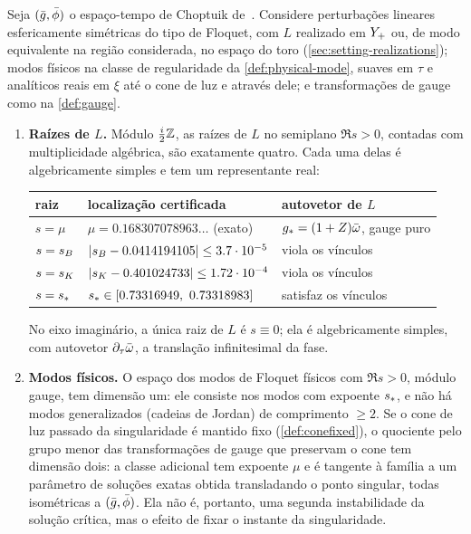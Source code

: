 \begin{mainthm}
Seja $(\bar g,\bar\phi)$ o espaço-tempo de Choptuik de~\cite{RT2019}. Considere perturbações lineares
esfericamente simétricas do tipo de Floquet, com $L$ realizado em $Y_{+}$ ou, de modo equivalente na região considerada,
no espaço do toro (\cref{sec:setting-realizations}); modos físicos na classe de regularidade da \cref{def:physical-mode},
suaves em $\tau$ e analíticos reais em $\xi$ até o cone de luz e através dele; e transformações de gauge como na
\cref{def:gauge}.
\begin{enumerate}[label=\textup{(\arabic*)},leftmargin=*]
\item \textbf{Raízes de $L$.} Módulo $\tfrac{i}{2}\mathbb{Z}$, as raízes de $L$ no semiplano $\Re s>0$, contadas
  com multiplicidade algébrica, são exatamente quatro. Cada uma delas é algebricamente simples e tem um
  representante real:
  \begin{center}
  \begin{tabular}{@{}lll@{}}
  \toprule
  raiz & localização certificada & autovetor de $L$ \\
  \midrule
  $s=\mu$ & $\mu=0.168307078963\ldots$ (exato) & $g_*=(1+Z)\bar\omega$, gauge puro \\
  $s=s_{B}$ & $|s_{B}-0.0414194105|\le 3.7\cdot10^{-5}$ & viola os vínculos \\
  $s=s_{K}$ & $|s_{K}-0.401024733|\le 1.72\cdot10^{-4}$ & viola os vínculos \\
  $s=s_{\ast}$ & $s_{\ast}\in[0.73316949,\ 0.73318983]$ & satisfaz os vínculos \\
  \bottomrule
  \end{tabular}
  \end{center}
  No eixo imaginário, a única raiz de $L$ é $s\equiv 0$; ela é algebricamente simples, com autovetor
  $\partial_\tau\bar\omega$, a translação infinitesimal da fase.
\item \textbf{Modos físicos.} O espaço dos modos de Floquet físicos com $\Re s>0$, módulo gauge, tem
  dimensão um: ele consiste nos modos com expoente $s_{\ast}$, e não há modos generalizados
  \textup{(}cadeias de Jordan\textup{)} de comprimento $\ge2$. Se o cone de luz passado da singularidade é mantido fixo
  (\cref{def:conefixed}), o quociente pelo grupo menor das transformações de gauge que preservam o cone tem
  dimensão dois: a classe adicional tem expoente $\mu$ e é tangente à família a um parâmetro de
  soluções exatas obtida transladando o ponto singular, todas isométricas a
  $(\bar g,\bar\phi)$. Ela não é, portanto, uma segunda instabilidade da solução crítica, mas o efeito de
  fixar o instante da singularidade.
\end{enumerate}
\end{mainthm}

